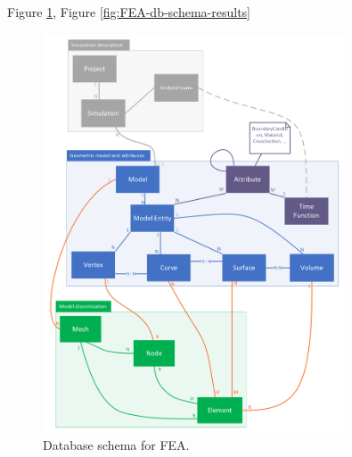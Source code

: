 
Figure \ref{fig:FEA-db-schema}, Figure \ref{fig:FEA-db-schema-results}


\begin{figure}[H]
    \centering
    \includegraphics[width=0.8\textwidth]{figures/FEA-database-schema}
    \decoRule
    \caption{Database schema for FEA.}
    \label{fig:FEA-db-schema}
\end{figure}

